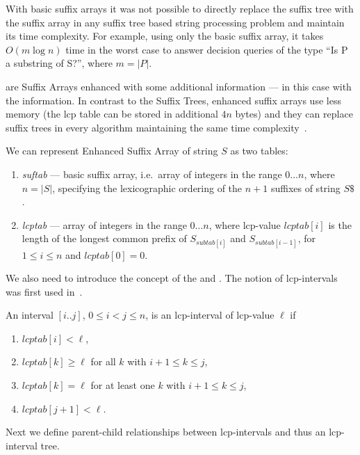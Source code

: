 With basic suffix arrays it was not possible to directly replace the suffix tree with the suffix array in any suffix tree based string processing problem and maintain its time complexity. For example, using only the basic suffix array, it takes $O(m \log n)$ time in the worst case to answer decision queries of the type ``Is P a substring of S?'', where $m = |P|$.

 are Suffix Arrays enhanced with some additional information --- in this case with the  information.
In contrast to the Suffix Trees, enhanced suffix arrays use less memory (the lcp table can be stored in additional $4n$ bytes) and they can replace suffix trees in every algorithm maintaining the same time complexity~\cite{enhancedsuffixarrays}.

We can represent Enhanced Suffix Array of string $S$ as two tables:
\begin{enumerate}
  \item \emph{suftab} --- basic suffix array, i.e.\ array of integers in the range $0\dots n$, where $n = |S|$, specifying the lexicographic ordering of the $n + 1$ suffixes of string $S\$ $.
  \item \emph{lcptab} --- array of integers in the range $0\dots n$, where lcp-value $lcptab[i]$ is the length of the longest common prefix of $S_{subtab[i]}$ and $S_{subtab[i-1]}$, for $1 \leq i \leq n$ and $lcptab[0] = 0$.
\end{enumerate}

We also need to introduce the concept of the  and . The notion of lcp-intervals was first used in~\cite{enhancedsuffixarrays}.
\begin{definition}
An interval $[i..j]$, $0 \leq i < j \leq n$, is an lcp-interval of lcp-value $\ell$ if

\begin{enumerate}
\item $lcptab[i] < \ell$,
\item $lcptab[k] \geq \ell$ for all $k$ with $i + 1 \leq k \leq j$,
\item $lcptab[k] = \ell$ for at least one $k$ with $i + 1 \leq k \leq j$,
\item $lcptab[j + 1] < \ell$.
\end{enumerate}
\end{definition}

Next we define parent-child relationships between lcp-intervals and thus an lcp-interval tree\cite{enhancedsuffixarrays}.

